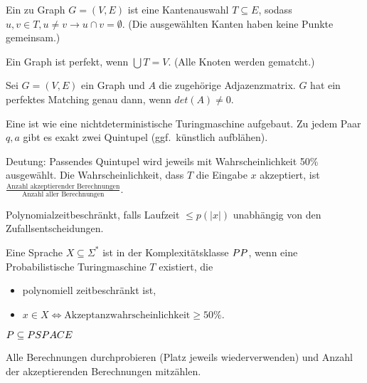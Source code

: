 

\begin{definition}

    Ein  zu Graph $G= (V, E)$ ist eine
    Kantenauswahl $T \subseteq E$, sodass
    $u, v \in T, u \neq v \rightarrow u \cap v = \emptyset$.
    (Die ausgewählten Kanten haben keine Punkte gemeinsam.)

    Ein Graph ist perfekt, wenn $\bigcup T = V$.
    (Alle Knoten werden gematcht.)

\end{definition}


\begin{satz}
    Sei $G=(V,E)$ ein Graph und $A$ die zugehörige Adjazenzmatrix.
    $G$ hat ein perfektes Matching genau dann, wenn $det(A) \neq 0$.
\end{satz}



\begin{definition}
    Eine  ist wie eine nichtdeterministische
    Turingmaschine aufgebaut. Zu jedem Paar $q, a$ gibt es exakt zwei Quintupel
    (ggf.\ künstlich aufblähen).
\end{definition}

Deutung:
Passendes Quintupel wird jeweils mit Wahrscheinlichkeit 50\% ausgewählt.
Die Wahrscheinlichkeit, dass $T$ die Eingabe $x$ akzeptiert, ist
$\frac{\text{Anzahl akzeptierender Berechnungen}}{\text{Anzahl aller Berechnungen}}$.

Polynomialzeitbeschränkt, falls Laufzeit $\leq p(|x|)$ unabhängig von den Zufallsentscheidungen.


\begin{definition}
    Eine Sprache $X \subseteq \Sigma^\ast$ ist in der Komplexitätsklasse $PP$,
    wenn eine Probabilistische Turingmaschine $T$ existiert, die
    \begin{itemize}
        \item polynomiell zeitbeschränkt ist,
        \item $x \in X \Leftrightarrow \text{Akzeptanzwahrscheinlichkeit} \geq 50\%$.
    \end{itemize}
\end{definition}

\begin{satz}
    $P \subseteq PSPACE$
\end{satz}
\begin{beweis}
    Alle Berechnungen durchprobieren (Platz jeweils wiederverwenden) und Anzahl der
    akzeptierenden Berechnungen mitzählen.
\end{beweis}

